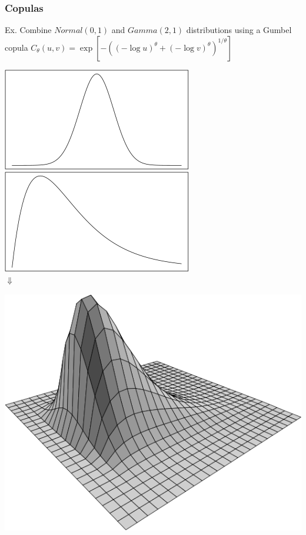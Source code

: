 \documentclass{beamer}
\begin{document}
	\begin{frame}
		\frametitle{Copulas}
		Ex. Combine $Normal(0,1)$ and $Gamma(2,1)$ distributions using a Gumbel copula $C_{\theta}(u,v)=\exp[-( (-\log u)^\theta + (-\log v)^\theta )^{1/\theta}]$	
		\begin{center}
			\includegraphics[scale=0.31]{fig/normal}
			\quad
			\includegraphics[scale=0.31]{fig/gamma}\\
			$\Downarrow$
		\end{center}
		\begin{center}	
			\includegraphics[scale=0.2]{fig/gumbel_cop}
		\end{center}
	\end{frame}
		
\end{document}
